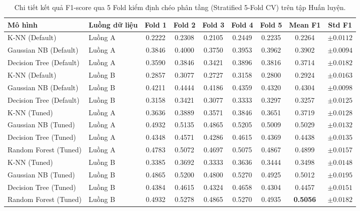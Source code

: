 \documentclass[12pt,a4paper]{article}
\begin{document}
\begin{table}[H]
\centering
\caption{Chi tiết kết quả F1-score qua 5 Fold kiểm định chéo phân tầng (Stratified 5-Fold CV) trên tập Huấn luyện.}
\label{tab:cv_folds_detail}
\small
\renewcommand{\arraystretch}{1.2}
\begin{tabular}{|l|l|c|c|c|c|c|c|c|}
\hline
\textbf{Mô hình} & \textbf{Luồng dữ liệu} & \textbf{Fold 1} & \textbf{Fold 2} & \textbf{Fold 3} & \textbf{Fold 4} & \textbf{Fold 5} & \textbf{Mean F1} & \textbf{Std F1} \\
\hline
K-NN (Default) & Luồng A & 0.2222 & 0.2308 & 0.2105 & 0.2449 & 0.2235 & 0.2264 & $\pm 0.0112$ \\
\hline
Gaussian NB (Default) & Luồng A & 0.3846 & 0.4000 & 0.3750 & 0.3953 & 0.3962 & 0.3902 & $\pm 0.0094$ \\
\hline
Decision Tree (Default)& Luồng A & 0.3590 & 0.3846 & 0.3421 & 0.3896 & 0.3816 & 0.3714 & $\pm 0.0182$ \\
\hline
K-NN (Default) & Luồng B & 0.2857 & 0.3077 & 0.2727 & 0.3158 & 0.2800 & 0.2924 & $\pm 0.0163$ \\
\hline
Gaussian NB (Default) & Luồng B & 0.4211 & 0.4444 & 0.4186 & 0.4359 & 0.4320 & 0.4304 & $\pm 0.0098$ \\
\hline
Decision Tree (Default)& Luồng B & 0.3158 & 0.3421 & 0.3077 & 0.3333 & 0.3297 & 0.3257 & $\pm 0.0125$ \\
\hline
K-NN (Tuned) & Luồng A & 0.3636 & 0.3889 & 0.3571 & 0.3846 & 0.3651 & 0.3719 & $\pm 0.0128$ \\
\hline
Gaussian NB (Tuned) & Luồng A & 0.4932 & 0.5135 & 0.4865 & 0.5205 & 0.5009 & 0.5029 & $\pm 0.0132$ \\
\hline
Decision Tree (Tuned) & Luồng A & 0.4348 & 0.4571 & 0.4286 & 0.4615 & 0.4369 & 0.4438 & $\pm 0.0135$ \\
\hline
Random Forest (Tuned) & Luồng A & 0.4783 & 0.5072 & 0.4697 & 0.5075 & 0.4867 & 0.4899 & $\pm 0.0157$ \\
\hline
K-NN (Tuned) & Luồng B & 0.3385 & 0.3692 & 0.3333 & 0.3636 & 0.3444 & 0.3498 & $\pm 0.0148$ \\
\hline
Gaussian NB (Tuned) & Luồng B & 0.4865 & 0.5200 & 0.4800 & 0.5270 & 0.4925 & 0.5012 & $\pm 0.0195$ \\
\hline
Decision Tree (Tuned) & Luồng B & 0.4384 & 0.4615 & 0.4324 & 0.4658 & 0.4304 & 0.4457 & $\pm 0.0151$ \\
\hline
Random Forest (Tuned) & Luồng B & 0.4932 & 0.5278 & 0.4865 & 0.5270 & 0.4935 & \textbf{0.5056} & $\pm 0.0182$ \\
\hline
\end{tabular}
\end{table}
\end{document}
